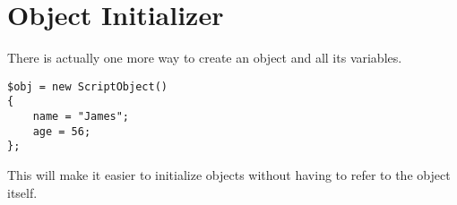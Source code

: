\section{Object Initializer}

There is actually one more way to create an object and all its variables.

\begin{lstlisting}[style=ts]
$obj = new ScriptObject()
{
	name = "James";
	age = 56;
};
\end{lstlisting}

This will make it easier to initialize objects without having to refer to the object itself.
